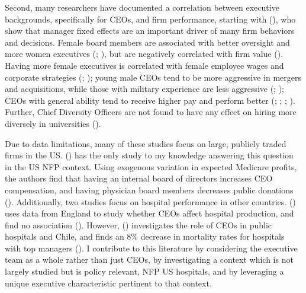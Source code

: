 \documentclass[12pt]{article}
\begin{document}
    Second, many researchers have documented a correlation between executive backgrounds, specifically for CEOs, and firm performance, starting with \citeauthor{bertrand2003managing} (\citeyear{bertrand2003managing}), who show that manager fixed effects are an important driver of many firm behaviors and decisions. Female board members are associated with better oversight and more women executives (\cite{matsa2011chipping}; \cite{adams2009women}), but are negatively correlated with firm value (\cite{ahern2012changing}). Having more female executives is correlated with female employee wages and corporate strategies (\cite{flabbi2019female}; \cite{matsa2013female}); young male CEOs tend to be more aggressive in mergers and acquisitions, while those with military experience are less aggressive (\cite{levi2010deal}; \cite{benmelech2015military}); CEOs with general ability tend to receive higher pay and perform better (\cite{kaplan2012ceo}; \cite{custodio2013generalists}; \cite{adams2018director}; \cite{frydman2019rising}). Further, Chief Diversity Officers are not found to have any effect on hiring more diversely in universities (\cite{bradley2022impact}). 
    
    Due to data limitations, many of these studies focus on large, publicly traded firms in the US. \citeauthor{brickley2010board} (\citeyear{brickley2010board}) has the only study to my knowledge answering this question in the US NFP context. Using exogenous variation in expected Medicare profits, the authors find that having an internal board of directors increases CEO compensation, and having physician board members decreases public donations (\cite{brickley2010board}). Additionally, two studies focus on hospital performance in other countries. \citeauthor{janke2019impact} (\citeyear{janke2019impact}) uses data from England to study whether CEOs affect hospital production, and find no association (\cite{janke2019impact}). However, \citeauthor{otero2022managers} (\citeyear{otero2022managers}) investigates the role of CEOs in public hospitals and Chile, and finds an 8\% decrease in mortality rates for hospitals with top managers (\cite{otero2022managers}). I contribute to this literature by considering the executive team as a whole rather than just CEOs, by investigating a context which is not largely studied but is policy relevant, NFP US hospitals, and by leveraging a unique executive characteristic pertinent to that context. 
\end{document}
